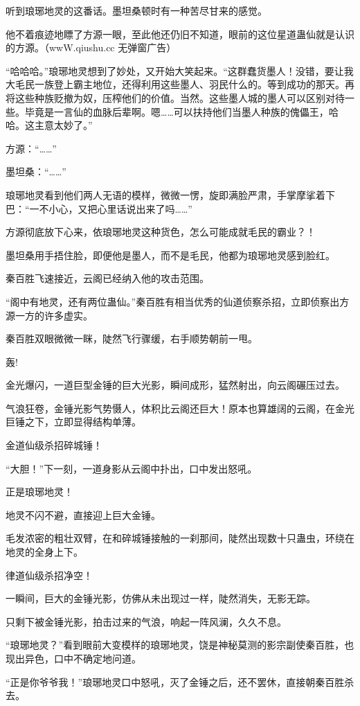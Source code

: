 \begin{this_body}
听到琅琊地灵的这番话。墨坦桑顿时有一种苦尽甘来的感觉。

他不着痕迹地瞟了方源一眼，至此他还仍旧不知道，眼前的这位星道蛊仙就是认识的方源。（wwW.qiushu.cc 无弹窗广告）

“哈哈哈。”琅琊地灵想到了妙处，又开始大笑起来。“这群蠢货墨人！没错，要让我大毛民一族登上霸主地位，还得利用这些墨人、羽民什么的。等到成功的那天。再将这些种族贬撤为奴，压榨他们的价值。当然。这些墨人城的墨人可以区别对待一些。毕竟是一言仙的血脉后辈啊。嗯……可以扶持他们当墨人种族的傀儡王，哈哈。这主意太妙了。”

方源：“……”

墨坦桑：“……”

琅琊地灵看到他们两人无语的模样，微微一愣，旋即满脸严肃，手掌摩挲着下巴：“一不小心，又把心里话说出来了吗……”

方源彻底放下心来，依琅琊地灵这种货色，怎么可能成就毛民的霸业？！

墨坦桑用手捂住脸，即便他是墨人，而不是毛民，他都为琅琊地灵感到脸红。

秦百胜飞速接近，云阁已经纳入他的攻击范围。

“阁中有地灵，还有两位蛊仙。”秦百胜有相当优秀的仙道侦察杀招，立即侦察出方源一方的许多虚实。

秦百胜双眼微微一眯，陡然飞行骤缓，右手顺势朝前一甩。

轰!

金光爆闪，一道巨型金锤的巨大光影，瞬间成形，猛然射出，向云阁碾压过去。

气浪狂卷，金锤光影气势慑人，体积比云阁还巨大！原本也算雄阔的云阁，在金光巨锤之下，立即显得结构单薄。

金道仙级杀招碎城锤！

“大胆！”下一刻，一道身影从云阁中扑出，口中发出怒吼。

正是琅琊地灵！

地灵不闪不避，直接迎上巨大金锤。

毛发浓密的粗壮双臂，在和碎城锤接触的一刹那间，陡然出现数十只蛊虫，环绕在地灵的全身上下。

律道仙级杀招净空！

一瞬间，巨大的金锤光影，仿佛从未出现过一样，陡然消失，无影无踪。

只剩下被金锤光影，拍击过来的气浪，响起一阵风澜，久久不息。

“琅琊地灵？”看到眼前大变模样的琅琊地灵，饶是神秘莫测的影宗副使秦百胜，也现出异色，口中不确定地问道。

“正是你爷爷我！”琅琊地灵口中怒吼，灭了金锤之后，还不罢休，直接朝秦百胜杀去。


\end{this_body}
